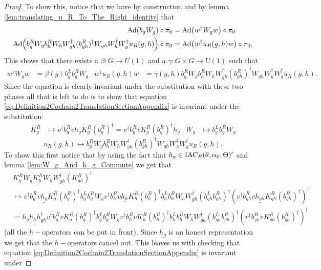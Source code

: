 \documentclass[12pt,a4paper,twoside]{article}
\numberwithin{equation}{section}
\begin{document}
\begin{proof}
	 To show this, notice that we have by construction and by lemma \ref{lem:translating_u_R_To_The_Right_identity} that
	\begin{align}
		\Ad{b_g W_g}\circ\pi_0&=\Ad{w^\dagger W_g w}\circ\pi_0\\
		\Ad{b_g^R W_g b_h^R W_h W_{gh}^\dagger (b_{gh}^R)^\dagger W_{gh}W_h^\dagger W_g^\dagger u_R(g,h)}\circ\pi_0&=\Ad{w^\dagger u_R(g,h) w}\circ\pi_0.
	\end{align}
	This shows that there exists a $\beta:G\rightarrow U(1)$ and a $\gamma:G\times G\rightarrow U(1)$ such that
	\begin{align}
		w^\dagger W_g w&=\beta(g)b_g^Lb_g^RW_g&w^\dagger u_R(g,h) w&=\gamma(g,h)b_g^R W_g b_h^R W_h W_{gh}^\dagger (b_{gh}^R)^\dagger W_{gh}W_h^\dagger W_g^\dagger u_R(g,h).
	\end{align}
	Since the equation is clearly invariant under the substitution with these two phases all that is left to do is to show that equation \eqref{eq:Definition2Cochain2TranslationSectionAppendix} is invariant under the substitution:
	\begin{align}
		K_g^R&\mapsto v^\dagger b_g^R v h_g K_g^R (b_g^R)^\dagger=v^\dagger b_g^R v K_g^R (b_g^R)^\dagger h_g&W_g&\mapsto b_g^Lb_g^RW_g
	\end{align}
	\begin{equation}
		u_R(g,h)\mapsto b_g^R W_g b_h^R W_h W_{gh}^\dagger (b_{gh}^R)^\dagger W_{gh}W_h^\dagger W_g^\dagger u_R(g,h).
	\end{equation}
	To show this first notice that by using the fact that $h_g\in\textrm{IAC}_R(\theta,\alpha_0,\Theta)'$ and lemma \ref{lem:W_g_And_h_g_Commute} we get that
	\begin{align}
		&K_g^R W_g K_h^R W_ hW_{gh}^\dagger(K_{gh}^R)^\dagger\\
		&\mapsto v^\dagger b_g^R v \underline{h_g} K_g^R (b_g^R)^\dagger b_g^Lb_g^RW_g v^\dagger b_h^R v \underline{h_h} K_h^R (b_h^R)^\dagger b_h^Lb_h^RW_h W_{gh}^\dagger (b_{gh}^Lb_{gh}^R)^\dagger (v^\dagger b_{gh}^R v \underline{h_{gh}} K_{gh}^R (b_{gh}^R)^\dagger)^\dagger\\
		&=\underline{h_gh_hh_{gh}^\dagger} v^\dagger b_g^R v  K_g^R (b_g^R)^\dagger b_g^Lb_g^RW_g v^\dagger b_h^R v  K_h^R (b_h^R)^\dagger b_h^Lb_h^RW_h W_{gh}^\dagger (b_{gh}^Lb_{gh}^R)^\dagger (v^\dagger b_{gh}^R v  K_{gh}^R (b_{gh}^R)^\dagger)^\dagger
	\end{align}
	(all the $h-$operators can be put in front). Since $h_g$ is an honest representation we get that the $h-$operators cancel out. This leaves us with checking that equation \eqref{eq:Definition2Cochain2TranslationSectionAppendix} is invariant under

\end{proof}
\end{document}
